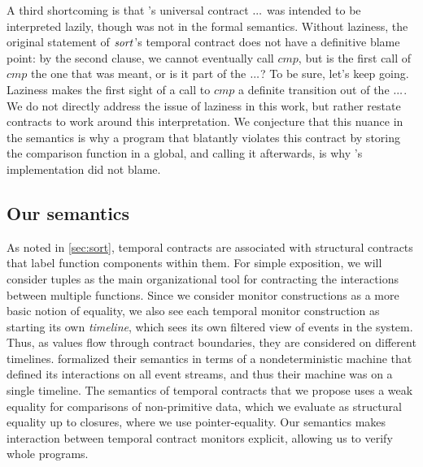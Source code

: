 A third shortcoming is that \dfm's universal contract ${\tt ...}$ was intended to be interpreted lazily, though was not in the formal semantics.
%
Without laziness, the original statement of $\mathit{sort}$'s temporal contract does not have a definitive blame point: by the second clause, we cannot eventually call $\mathit{cmp}$, but is the first call of $\mathit{cmp}$ the one that was meant, or is it part of the ${\tt ...}$? To be sure, let's keep going.
%
Laziness makes the first sight of a call to $\mathit{cmp}$ a definite transition out of the ${\tt ...}$.
%
We do not directly address the issue of laziness in this work, but rather restate contracts to work around this interpretation.
%
We conjecture that this nuance in the semantics is why a program that blatantly violates this contract by storing the comparison function in a global, and calling it afterwards, is why \dfm's implementation did not blame.
%

\subsection{Our semantics}
%
As noted in \autoref{sec:sort}, temporal contracts are associated with structural contracts that label function components within them.
%
For simple exposition, we will consider tuples as the main organizational tool for contracting the interactions between multiple functions.
%
Since we consider monitor constructions as a more basic notion of equality, we also see each temporal monitor construction as starting its own \emph{timeline}, which sees its own filtered view of events in the system.
%
Thus, as values flow through contract boundaries, they are considered on different timelines.
%
\dfm{} formalized their semantics in terms of a nondeterministic machine that defined its interactions on all event streams, and thus their machine was on a single timeline.
%
The semantics of temporal contracts that we propose uses a weak equality for comparisons of non-primitive data, which we evaluate as structural equality up to closures, where we use pointer-equality.
%
Our semantics makes interaction between temporal contract monitors explicit, allowing us to verify whole programs.

